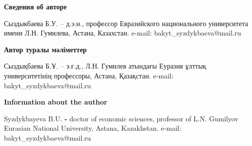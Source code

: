 \begin{authorinfo}
{\bfseries Сведения об авторе}

Сыздыкбаева Б.У. -- д.э.н., профессор Евразийского национального
университета имени Л.Н. Гумилева, Астана, Казахстан. e-mail:
bakyt\_syzdykbaeva@mail.ru

{\bfseries Автор туралы мәліметтер}

Сыздықбаева Б.Ұ. -- э.ғ.д., Л.Н. Гумилев атындағы Еуразия ұлттық
университетінің профессоры, Астана, Қазақстан. e-mail:
bakyt\_syzdykbaeva@mail.ru

{\bfseries Information about the author}

Syzdykbayeva B.U. {\bfseries -} doctor of economic sciences, professor of
L.N. Gumilyov Eurasian National University, Astana, Kazakhstan. e-mail:
bakyt\_syzdykbaeva@mail.ru
\end{authorinfo}
